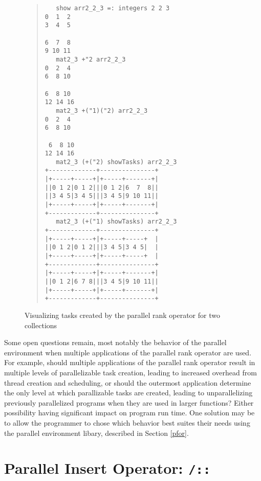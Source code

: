 \begin{figure}[p]
\begin{quote}
\begin{singlespacing}
\begin{small}
\begin{verbatim}
   show arr2_2_3 =: integers 2 2 3
0  1  2
3  4  5

6  7  8
9 10 11
   mat2_3 +"2 arr2_2_3
0  2  4
6  8 10

6  8 10
12 14 16
   mat2_3 +("1)("2) arr2_2_3
0  2  4
6  8 10

 6  8 10
12 14 16
   mat2_3 (+("2) showTasks) arr2_2_3
+-------------+---------------+
|+-----+-----+|+-----+-------+|
||0 1 2|0 1 2|||0 1 2|6  7  8||
||3 4 5|3 4 5|||3 4 5|9 10 11||
|+-----+-----+|+-----+-------+|
+-------------+---------------+
   mat2_3 (+("1) showTasks) arr2_2_3
+-------------+---------------+
|+-----+-----+|+-----+-----+  |
||0 1 2|0 1 2|||3 4 5|3 4 5|  |
|+-----+-----+|+-----+-----+  |
+-------------+---------------+
|+-----+-----+|+-----+-------+|
||0 1 2|6 7 8|||3 4 5|9 10 11||
|+-----+-----+|+-----+-------+|
+-------------+---------------+
\end{verbatim}
\end{small}
\end{singlespacing}
\end{quote}
\caption{Visualizing tasks created by the parallel rank operator for two collections}
\label{fig::pr_tasks2}
\end{figure}

Some open questions remain, most notably 
the behavior of the parallel environment when multiple applications of the parallel rank operator are used. 
For example, should multiple applications of the parallel rank operator result in multiple levels of parallelizable task creation, 
leading to increased overhead from thread creation and scheduling, 
or should the outermost application determine the only level at which parallizable tasks are created, 
leading to unparallelizing previously parallelized programs when they are used in larger functions? 
Either possibility having significant impact on program run time.
One solution may be to allow the programmer to chose which behavior best suites their needs 
using the parallel environment libary, described in Section \ref{pfor}.

\section{Parallel Insert Operator: \texttt{/::}}
\label{pins}
